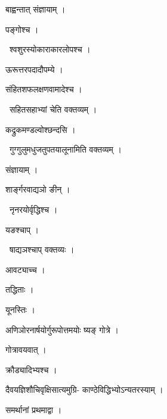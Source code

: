\documentclass[10pt, openany, oneside]{book}
\begin{document}
\noindent बाह्वन्तात् संज्ञायाम् ।

\noindent पङ्गोश्च ।

\par\noindent\hspace{1.5em}{\vps वा॰}~{\qt श्वशुरस्योकाराकारलोपश्च ।}

\noindent ऊरूत्तरपदादौपम्ये ।

\noindent संहितशफलक्षणवामादेश्च ।

\par\noindent\hspace{1.5em}{\vps वा॰}~{\qt सहितसहाभ्यां चेति वक्तव्यम् ।}

\noindent कद्रुकमण्डल्वोश्छन्दसि ।

\par\noindent\hspace{1.5em}{\vps वा॰}~{\qt गुग्गुलुमधुजतुपतयालूनामिति वक्तव्यम् ।}

\noindent संज्ञायाम् ।

\noindent शार्ङ्गरवाद्यञो ङीन् ।

\par\noindent\hspace{1.5em}{\vps वा॰}~{\qt नृनरयोर्वृद्धिश्च ।}

\noindent यङश्चाप् ।

\par\noindent\hspace{1.5em}{\vps वा॰}~{\qt षाद्यञश्चाप् वक्तव्यः ।}

\noindent आवट्याच्च ।

\noindent तद्धिताः ।

\noindent यूनस्तिः ।

\noindent अणिञोरनार्षयोर्गुरूपोत्तमयोः ष्यङ् गोत्रे ।

\noindent गोत्रावयवात् ।

\noindent क्रौड्यादिभ्यश्च ।

\noindent दैवयज्ञिशौचिवृक्षिसात्यमुग्रि- काण्ठेविद्धिभ्योऽन्यतरस्याम् ।

\noindent समर्थानां प्रथमाद्वा ।
\end{document}
